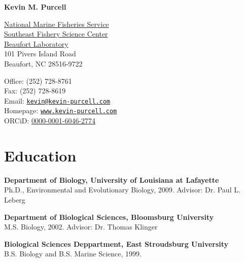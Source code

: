 \documentclass[letterpaper]{article}
\def\name{Kevin M. Purcell}
\renewenvironment{itemize}{
  \begin{list}{}{
    \setlength{\leftmargin}{1em}
  }
}{
  \end{list}
}
\begin{document}
\centerline{\huge\bf \name}
\hrulefill
\vspace{0.25in}

\begin{minipage}[t]{0.5\textwidth}
  \href{http://nmfs.noaa.gov/}{National Marine Fisheries Service}\\
  \href{http://www.sefsc.noaa.gov/labs/beaufort/}{Southeast Fishery Science Center}\\
  \href{http://www.biology.ull.edu/}{Beaufort Laboratory} \\
  101 Pivers Island Road \\
  Beaufort, NC 28516-9722 \\

\end{minipage}
\begin{minipage}[t]{0.5\textwidth}
  Office: (252) 728-8761 \\
  Fax: (252) 728-8619 \\
  Email: \href{mailto:kevin@kevin-purcell.com}{\tt kevin@kevin-purcell.com} \\
  Homepage: \href{http:www.kevin-purcell.com/}{\tt www.kevin-purcell.com} \\
  ORCiD: \href{http://orcid.org/0000-0001-6046-2774}{0000-0001-6046-2774} \\
\end{minipage}


\section*{Education}
	\begin{itemize}
		\item \textbf{Department of Biology, University of Louisiana at Lafayette}\\
    Ph.D., Environmental and Evolutionary Biology, 2009. Advisor: Dr. Paul L. Leberg

		\item \textbf{Department of Biological Sciences, Bloomsburg University} \\
			M.S. Biology, 2002. Advisor: Dr. Thomas Klinger
      
		\item \textbf{Biological Sciences Deppartment, East Stroudsburg University} \\
			B.S. Biology and B.S. Marine Science, 1999.
	\end{itemize}
\end{document}
